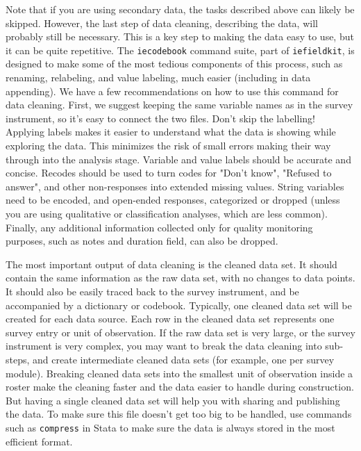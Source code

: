 Note that if you are using secondary data, 
the tasks described above can likely be skipped.
However, the last step of data cleaning, describing the data,
will probably still be necessary.
This is a key step to making the data easy to use, but it can be quite repetitive.
The \texttt{iecodebook} command suite, part of \texttt{iefieldkit},
is designed to make some of the most tedious components of this process,
such as renaming, relabeling, and value labeling,
much easier (including in data appending).
We have a few recommendations on how to use this command for data cleaning.
First, we suggest keeping the same variable names as in the survey instrument,
so it's easy to connect the two files.
Don't skip the labelling!
Applying labels makes it easier to understand what the data is showing while exploring the data. 
This minimizes the risk of small errors making their way through into the analysis stage.
Variable and value labels should be accurate and concise.
Recodes should be used to turn codes for "Don't know", "Refused to answer", and
other non-responses into extended missing values.
String variables need to be encoded, and open-ended responses, categorized or dropped
(unless you are using qualitative or classification analyses, which are less common).
Finally, any additional information collected only for quality monitoring purposes,
such as notes and duration field, can also be dropped.


The most important output of data cleaning is the cleaned data set. 
It should contain the same information as the raw data set,
with no changes to data points.
It should also be easily traced back to the survey instrument,
and be accompanied by a dictionary or codebook.
Typically, one cleaned data set will be created for each data source.
Each row in the cleaned data set represents one survey entry or unit of observation.
If the raw data set is very large, or the survey instrument is very complex,
you may want to break the data cleaning into sub-steps, 
and create intermediate cleaned data sets
(for example, one per survey module).
Breaking cleaned data sets into the smallest unit of observation inside a roster
make the cleaning faster and the data easier to handle during construction.
But having a single cleaned data set will help you with sharing and publishing the data.
To make sure this file doesn't get too big to be handled,
use commands such as \texttt{compress} in Stata to make sure the data
is always stored in the most efficient format.

